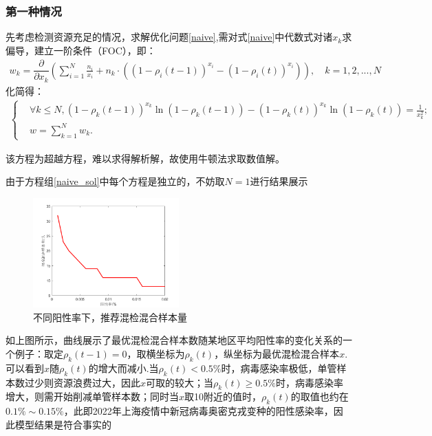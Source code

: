 \documentclass[withoutpreface,bwprint]{cumcmthesis} %
\begin{document}
\subsubsection{第一种情况}
先考虑检测资源充足的情况，求解优化问题\ref{naive},需对式\ref{naive}中代数式对诸$x_k$求偏导，建立一阶条件（FOC），即：
\begin{align*}
w_k = \dfrac{\partial}{\partial x_k} \left( \sum^N_{i=1} \frac{n_i}{x_i}+ n_k\cdot   ((1-\rho_i(t-1))^{x_i}-(1-\rho_i(t))^{x_i}) \right),\quad k=1,2,...,N
\end{align*}
化简得：
\begin{align}
\label{naive_sol}
\left\{
\begin{aligned}
        &\forall k \leqslant N,(1-\rho_k(t-1))^{x_k}\ln(1-\rho_k(t-1))-(1-\rho_k(t))^{x_k}\ln(1-\rho_k(t))=\frac{1}{x^2_k}; \\
    &w=\sum^N_{k=1}w_k.
\end{aligned}
\right.
\end{align}


该方程为超越方程，难以求得解析解，故使用牛顿法求取数值解。

由于方程组\ref{naive_sol}中每个方程是独立的，不妨取$N=1$进行结果展示
\begin{figure}[H]
\centering
\includegraphics[width=0.5\textwidth]{fig_pro1.png}
\caption{不同阳性率下，推荐混检混合样本量}
\label{pro1}
\end{figure}

如上图所示，曲线展示了最优混检混合样本数随某地区平均阳性率的变化关系的一个例子：取定$\rho_k(t-1)=0$，取横坐标为$\rho_k(t)$，纵坐标为最优混检混合样本$x$.可以看到$x$随$\rho_k(t)$的增大而减小.当$\rho_k(t)<0.5\%$时，病毒感染率极低，单管样本数过少则资源浪费过大，因此$x$可取的较大；当$\rho_k(t) \geqslant 0.5\%$时，病毒感染率增大，则需开始削减单管样本数；同时当$x$取10附近的值时，$\rho_k(t)$的取值也约在$0.1\% \sim 0.15\%$，此即2022年上海疫情中新冠病毒奥密克戎变种的阳性感染率，因此模型结果是符合事实的
\end{document}
